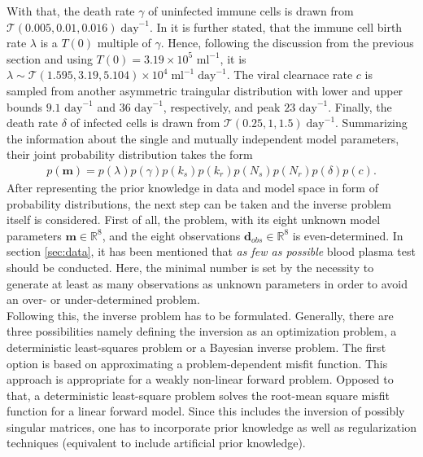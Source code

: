 With that, the death rate $\gamma$ of uninfected immune cells is drawn from $\mathcal{T}(0.005, 0.01, 0.016)\;\text{day}^{-1}$.
In \cite{rong2007emergence} it is further stated, that the immune cell birth rate $\lambda$ is a $T(0)$ multiple of $\gamma$.
Hence, following the discussion from the previous section and using $T(0) = 3.19\times 10^5 \text{ ml}^{-1}$, it is $\lambda \sim \mathcal{T}(1.595, 3.19, 5.104)\times 10^4\;\text{ml}^{-1}\;\text{day}^{-1}$.
The viral clearnace rate $c$ is sampled from another asymmetric traingular distribution with lower and upper bounds $9.1 \text{ day}^{-1}$ and $36 \text{ day}^{-1}$, respectively, and peak $23 \text{ day}^{-1}$.
Finally, the death rate $\delta$ of infected cells is drawn from $\mathcal{T}(0.25,1,1.5)\;\text{day}^{-1}$.\newline
Summarizing the information about the single and mutually independent model parameters, their joint probability distribution takes the form
\begin{align}
    p(\mathbf{m}) = p(\lambda)p(\gamma)p(k_s)p(k_r)p(N_s)p(N_r)p(\delta)p(c).
    \label{equ:prior_M}
\end{align}
After representing the prior knowledge in data and model space in form of probability distributions, the next step can be taken and the inverse problem itself is considered.
First of all, the problem, with its eight unknown model parameters $\mathbf{m} \in \mathbb{R}^8$, and the eight observations $\mathbf{d}_{obs} \in \mathbb{R}^8$ is even-determined.
In section \ref{sec:data}, it has been mentioned that \textit{as few as possible} blood plasma test should be conducted.
Here, the minimal number is set by the necessity to generate at least as many observations as unknown parameters in order to avoid an over- or under-determined problem.\\
Following this, the inverse problem has to be formulated.
Generally, there are three possibilities namely defining the inversion as an optimization problem, a deterministic least-squares problem or a Bayesian inverse problem.
The first option is based on approximating a problem-dependent misfit function. This approach is appropriate for a weakly non-linear forward problem.
Opposed to that, a deterministic least-square problem solves the root-mean square misfit function for a linear forward model.
Since this includes the inversion of possibly singular matrices, one has to incorporate prior knowledge as well as regularization techniques (equivalent to include artificial prior knowledge). 
